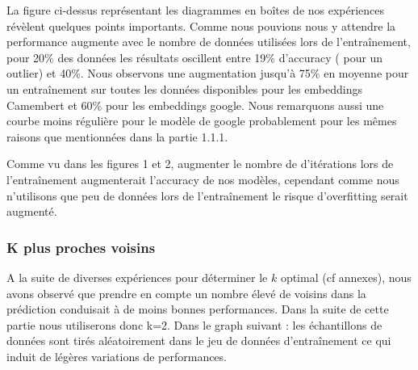 \documentclass[12pt]{article}
\begin{document}
La figure ci-dessus représentant les diagrammes en boîtes de nos expériences révèlent quelques points importants. 
Comme nous pouvions nous y attendre la performance augmente avec le nombre de données utilisées lors de l'entraînement,
pour 20\% des données  les résultats oscillent entre 19\% d'accuracy ( pour un outlier) et 40\%. Nous observons une augmentation 
jusqu'à 75\% en moyenne pour un entraînement sur toutes les données disponibles pour les embeddings Camembert et 60\% pour les 
embeddings google. Nous remarquons aussi une courbe moins régulière pour le modèle de google probablement pour les mêmes raisons que 
mentionnées dans la partie 1.1.1.

Comme vu dans les figures 1 et 2, augmenter le nombre de d'itérations lors de l'entraînement augmenterait l'accuracy 
de nos modèles, cependant comme nous n'utilisons que peu de données lors de l'entraînement le risque d'overfitting serait augmenté.
\subsubsection{K plus proches voisins}

A la suite de diverses expériences pour déterminer le $k$ optimal (cf annexes), nous avons observé que prendre en 
compte un nombre élevé de voisins dans la prédiction conduisait à de moins bonnes performances. Dans la suite de cette 
partie nous utiliserons donc k=2. Dans le graph suivant : les échantillons de données sont tirés aléatoirement dans le jeu
de données d'entraînement ce qui induit de légères variations de performances.
\end{document}
